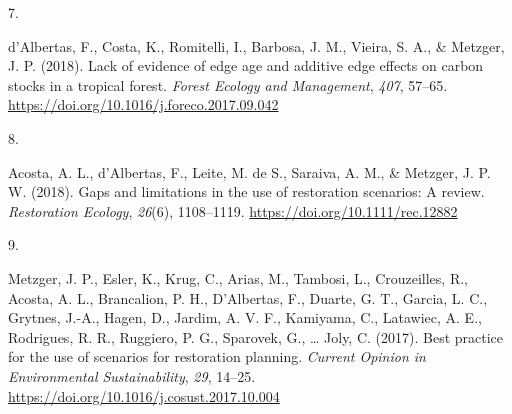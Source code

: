\documentclass[11pt,a4paper,]{awesome-cv}
\newlength{\cslhangindent}
\newlength{\csllabelwidth}
\newenvironment{CSLReferences}[2] %
 {\begin{list}{}{%
  \setlength{\itemindent}{0pt}
  \setlength{\leftmargin}{0pt}
  \setlength{\parsep}{0pt}
  \ifodd #1
   \setlength{\leftmargin}{\cslhangindent}
   \setlength{\itemindent}{-1\cslhangindent}
  \fi
  \setlength{\itemsep}{#2\baselineskip}}}
 {\end{list}}
\newcommand{\CSLLeftMargin}[1]{\parbox[t]{\csllabelwidth}{\strut#1\strut}}
\newcommand{\CSLRightInline}[1]{\parbox[t]{\linewidth - \csllabelwidth}{\strut#1\strut}}
\begin{document}
\begin{CSLReferences}{0}{0}
\CSLLeftMargin{7. }%
\CSLRightInline{d'Albertas, F., Costa, K., Romitelli, I., Barbosa, J.
M., Vieira, S. A., \& Metzger, J. P. (2018). Lack of evidence of edge
age and additive edge effects on carbon stocks in a tropical forest.
\emph{Forest Ecology and Management}, \emph{407}, 57--65.
\url{https://doi.org/10.1016/j.foreco.2017.09.042}}

\CSLLeftMargin{8. }%
\CSLRightInline{Acosta, A. L., d'Albertas, F., Leite, M. de S., Saraiva,
A. M., \& Metzger, J. P. W. (2018). Gaps and limitations in the use of
restoration scenarios: A review. \emph{Restoration Ecology},
\emph{26}(6), 1108--1119. \url{https://doi.org/10.1111/rec.12882}}

\CSLLeftMargin{9. }%
\CSLRightInline{Metzger, J. P., Esler, K., Krug, C., Arias, M., Tambosi,
L., Crouzeilles, R., Acosta, A. L., Brancalion, P. H., D'Albertas, F.,
Duarte, G. T., Garcia, L. C., Grytnes, J.-A., Hagen, D., Jardim, A. V.
F., Kamiyama, C., Latawiec, A. E., Rodrigues, R. R., Ruggiero, P. G.,
Sparovek, G., \ldots{} Joly, C. (2017). Best practice for the use of
scenarios for restoration planning. \emph{Current Opinion in
Environmental Sustainability}, \emph{29}, 14--25.
\url{https://doi.org/10.1016/j.cosust.2017.10.004}}

\end{CSLReferences}


\label{LastPage}~
\end{document}
